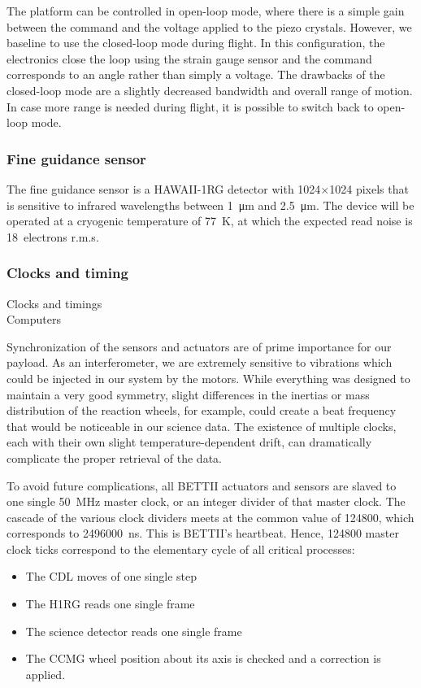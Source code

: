 The platform can be controlled in open-loop mode, where there is a simple gain between the command and the voltage applied to the piezo crystals. However, we baseline to use the closed-loop mode during flight. In this configuration, the electronics close the loop using the strain gauge sensor and the command corresponds to an angle rather than simply a voltage. The drawbacks of the closed-loop mode are a slightly decreased bandwidth and overall range of motion. In case more range is needed during flight, it is possible to switch back to open-loop mode. 


 
 
\subsubsection{Fine guidance sensor}

The fine guidance sensor is a HAWAII-1RG detector with 1024$\times$1024 pixels that is sensitive to infrared wavelengths between \SI{1}{\um} and \SI{2.5}{\um}. The device will be operated at a cryogenic temperature of \SI{77}{\kelvin}, at which the expected read noise is 18~electrons r.m.s.

\subsubsection{Clocks and timing}
Clocks and timings \\
Computers

Synchronization of the sensors and actuators are of prime importance for our payload. As an interferometer, we are extremely sensitive to vibrations which could be injected in our system by the motors. While everything was designed to maintain a very good symmetry, slight differences in the inertias or mass distribution of the reaction wheels, for example, could create a beat frequency that would be noticeable in our science data. The existence of multiple clocks, each with their own slight temperature-dependent drift, can dramatically complicate the proper retrieval of the data.

To avoid future complications, all BETTII actuators and sensors are slaved to one single \SI{50}{\mega\hertz} master clock, or an integer divider of that master clock. The cascade of the various clock dividers meets at the common value of \num{124800}, which corresponds to \SI{2496000}{\nano\second}. This is BETTII's heartbeat. Hence, \num{124800} master clock ticks correspond to the elementary cycle of all critical processes:
\begin{itemize}
\item The CDL moves of one single step
\item The H1RG reads one single frame
\item The science detector reads one single frame
\item The CCMG wheel position about its axis is checked and a correction is applied.
\end{itemize}

